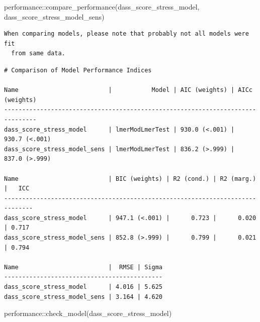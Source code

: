 \documentclass[
  letterpaper,
  DIV=11,
  numbers=noendperiod]{scrartcl}
\newenvironment{Shaded}{\begin{snugshade}}{\end{snugshade}}
\newcommand{\FunctionTok}[1]{\textcolor[rgb]{0.28,0.35,0.67}{#1}}
\newcommand{\NormalTok}[1]{\textcolor[rgb]{0.00,0.23,0.31}{#1}}
\newcommand{\SpecialCharTok}[1]{\textcolor[rgb]{0.37,0.37,0.37}{#1}}
\begin{document}
\begin{Shaded}
\begin{Highlighting}[]
\NormalTok{performance}\SpecialCharTok{::}\FunctionTok{compare\_performance}\NormalTok{(dass\_score\_stress\_model, dass\_score\_stress\_model\_sens)}
\end{Highlighting}
\end{Shaded}

\begin{verbatim}
When comparing models, please note that probably not all models were fit
  from same data.
\end{verbatim}

\begin{verbatim}
# Comparison of Model Performance Indices

Name                         |           Model | AIC (weights) | AICc (weights)
-------------------------------------------------------------------------------
dass_score_stress_model      | lmerModLmerTest | 930.0 (<.001) |  930.7 (<.001)
dass_score_stress_model_sens | lmerModLmerTest | 836.2 (>.999) |  837.0 (>.999)

Name                         | BIC (weights) | R2 (cond.) | R2 (marg.) |   ICC
------------------------------------------------------------------------------
dass_score_stress_model      | 947.1 (<.001) |      0.723 |      0.020 | 0.717
dass_score_stress_model_sens | 852.8 (>.999) |      0.799 |      0.021 | 0.794

Name                         |  RMSE | Sigma
--------------------------------------------
dass_score_stress_model      | 4.016 | 5.625
dass_score_stress_model_sens | 3.164 | 4.620
\end{verbatim}

\begin{Shaded}
\begin{Highlighting}[]
\NormalTok{performance}\SpecialCharTok{::}\FunctionTok{check\_model}\NormalTok{(dass\_score\_stress\_model)}
\end{Highlighting}
\end{Shaded}
\end{document}
